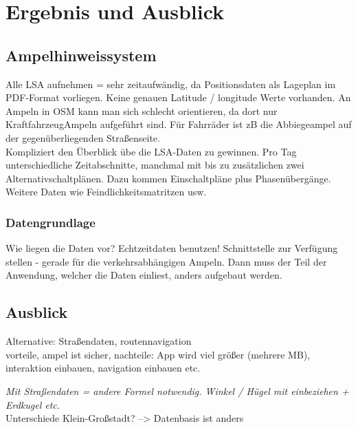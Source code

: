 \chapter{\label{chap:fazit}Ergebnis und Ausblick}
\section{Ampelhinweissystem}
Alle LSA aufnehmen = sehr zeitaufwändig, da Positionsdaten als Lageplan im \gls{PDF}-Format vorliegen. Keine genauen Latitude / longitude Werte vorhanden. An Ampeln in OSM kann man sich schlecht orientieren, da dort nur KraftfahrzeugAmpeln aufgeführt sind. Für Fahrräder ist zB die Abbiegeampel auf der gegenüberliegenden Straßenseite. \\
Kompliziert den Überblick übe die \gls{LSA}-Daten zu gewinnen. Pro Tag unterschiedliche Zeitabschnitte, manchmal mit bis zu zusätzlichen zwei Alternativschaltplänen. Dazu kommen Einschaltpläne plus Phasenübergänge. Weitere Daten wie Feindlichkeitsmatritzen usw.
\subsection{Datengrundlage}
Wie liegen die Daten vor? Echtzeitdaten benutzen! 
Schnittstelle zur Verfügung stellen - gerade für die verkehrsabhängigen Ampeln. Dann muss der Teil der Anwendung, welcher die Daten einliest, anders aufgebaut werden.

\section{Ausblick}

Alternative: Straßendaten, routennavigation\\ vorteile, ampel ist sicher, nachteile:
App wird viel größer (mehrere MB),  interaktion einbauen, navigation einbauen etc. 

\textit{Mit Straßendaten = andere Formel notwendig. Winkel / Hügel mit einbeziehen + Erdkugel etc.}\\

Unterschiede Klein-Großstadt? --> Datenbasis ist anders\\
